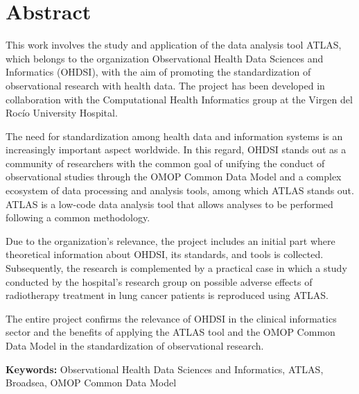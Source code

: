 \chapter*{Abstract}

This work involves the study and application of the data analysis tool ATLAS, which belongs to the organization Observational Health Data Sciences and Informatics (OHDSI), with the aim of promoting the standardization of observational research with health data. The project has been developed in collaboration with the Computational Health Informatics group at the Virgen del Rocío University Hospital.

The need for standardization among health data and information systems is an increasingly important aspect worldwide. In this regard, OHDSI stands out as a community of researchers with the common goal of unifying the conduct of observational studies through the OMOP Common Data Model and a complex ecosystem of data processing and analysis tools, among which ATLAS stands out. ATLAS is a low-code data analysis tool that allows analyses to be performed following a common methodology.

Due to the organization's relevance, the project includes an initial part where theoretical information about OHDSI, its standards, and tools is collected. Subsequently, the research is complemented by a practical case in which a study conducted by the hospital's research group on possible adverse effects of radiotherapy treatment in lung cancer patients is reproduced using ATLAS.

The entire project confirms the relevance of OHDSI in the clinical informatics sector and the benefits of applying the ATLAS tool and the OMOP Common Data Model in the standardization of observational research.



\vspace{.5cm}

\textbf{Keywords:} Observational Health Data Sciences and Informatics, ATLAS, Broadsea, OMOP Common Data Model 